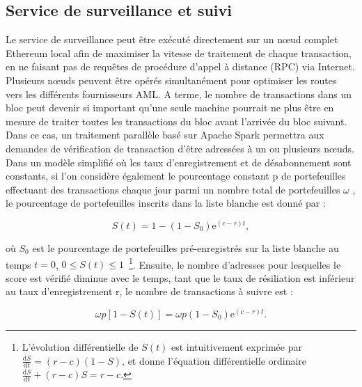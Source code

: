 ﻿\documentclass[a4paper]{article}
\begin{document}
\subsection{Service de surveillance et suivi}
Le service de surveillance peut être exécuté directement sur un nœud complet Ethereum local afin de maximiser la vitesse de traitement de chaque transaction, en ne faisant pas de requêtes de procédure d'appel à distance (RPC) via Internet. Plusieurs nœuds peuvent être opérés simultanément pour optimiser les routes vers les différents fournisseurs AML.
A terme, le nombre de transactions dans un bloc peut devenir si important qu'une seule machine pourrait ne plus être en mesure de traiter toutes les transactions du bloc avant l'arrivée du bloc suivant. Dans ce cas, un traitement parallèle basé sur Apache Spark permettra aux demandes de vérification de transaction d'être adressées à un ou plusieurs nœuds.
Dans un modèle simplifié où les taux d'enregistrement et de désabonnement sont constants, si l'on considère également le pourcentage constant p de portefeuilles effectuant des transactions chaque jour parmi un nombre total de portefeuilles $\omega$ , le pourcentage de portefeuilles inscrits dans la liste blanche est donné par :

$$S(t)=1-\left(1-S_0\right)\mathrm{e}^{(c-r)t},$$

\noindent où $S_0$ est le pourcentage de portefeuilles pré-enregistrés sur la liste blanche au temps $t=0$, $0\le S(t)\le 1$~\footnote{L'\'evolution diff\'erentielle de $S(t)$ est intuitivement exprim\'ee par $\frac{\mathrm{d}S}{\mathrm{d}t}=(r-c)(1-S)$, et donne l'\'equation diff\'erentielle ordinaire $\frac{\mathrm{d}S}{\mathrm{d}t}+(r-c)S=r-c$.}.
Ensuite, le nombre d'adresses pour lesquelles le score est vérifié diminue avec le temps, tant que le taux de résiliation  est inférieur au taux d'enregistrement r, le nombre de transactions à suivre est :

$$\omega p\left[1-S(t)\right]=\omega p\left(1-S_0\right)\mathrm{e}^{(c-r)t}.$$
\end{document}
